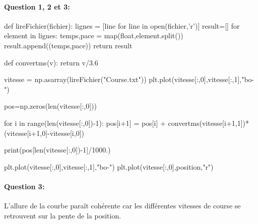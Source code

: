 \paragraph{Question 1, 2 et 3:}

\begin{verbatimtab}[3]

def lireFichier(fichier):
    lignes = [line for line in open(fichier,'r')]
    result=[]
    for element in lignes:
        temps,pace = map(float,element.split())
        result.append((temps,pace))
    return result

def convertms(v):
    return v/3.6

vitesse = np.asarray(lireFichier("Course.txt"))
plt.plot(vitesse[:,0],vitesse[:,1],"bo-")

pos=np.zeros(len(vitesse[:,0]))

for i in range(len(vitesse[:,0])-1):
    pos[i+1] = pos[i] + convertms(vitesse[i+1,1])*(vitesse[i+1,0]-vitesse[i,0])    
    
print(pos[len(vitesse[:,0])-1]/1000.)

plt.plot(vitesse[:,0],vitesse[:,1],"bo-")
plt.plot(vitesse[:,0],position,"r")
\end{verbatimtab}

\paragraph{Question 3:} L'allure de la courbe paraît cohérente car les différentes vitesses de course se retrouvent sur la pente de la position.


